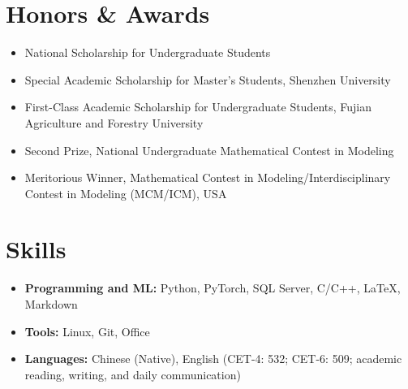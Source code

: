 \documentclass[a4paper,11pt]{article}
\newcommand{\resumeItemListStart}{\begin{itemize}[leftmargin=*,labelsep=1mm,itemsep=0.5mm]}
\newcommand{\resumeItemListEnd}{\end{itemize}\vspace{-2mm}}
\begin{document}
\vspace{-2mm}
\section{\textbf{Honors \& Awards}}
    \resumeItemListStart
    \item National Scholarship for Undergraduate Students
    \item Special Academic Scholarship for Master's Students, Shenzhen University
    \item First-Class Academic Scholarship for Undergraduate Students, Fujian Agriculture and Forestry University
    \item Second Prize, National Undergraduate Mathematical Contest in Modeling
    \item Meritorious Winner, Mathematical Contest in Modeling/Interdisciplinary Contest in Modeling (MCM/ICM), USA
    \resumeItemListEnd

\vspace{-2mm}
\section{\textbf{Skills}}
\vspace{-0.4mm}
    \resumeItemListStart
    \item \textbf{Programming and ML:} Python, PyTorch, SQL Server, C/C++, LaTeX, Markdown
    \item \textbf{Tools:} Linux, Git, Office
    \item \textbf{Languages:} Chinese (Native), English (CET-4: 532; CET-6: 509; academic reading, writing, and daily communication)
    \resumeItemListEnd

\end{document}
